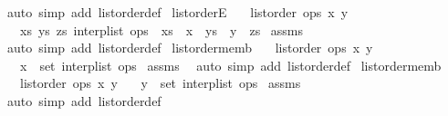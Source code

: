 \begin{isabellebody}
\ {\isacharparenleft}auto\ simp\ add{\isacharcolon}\ list{\isacharunderscore}order{\isacharunderscore}def{\isacharparenright}%
\endisatagproof
{\isafoldproof}%
%
\isadelimproof
\isanewline
%
\endisadelimproof
\isanewline
{}\isamarkupfalse%
\ list{\isacharunderscore}orderE{\isacharcolon}\isanewline
\ \ \ {\isachardoublequoteopen}list{\isacharunderscore}order\ ops\ x\ y{\isachardoublequoteclose}\isanewline
\ \ \ {\isachardoublequoteopen}{\isasymexists}xs\ ys\ zs{\isachardot}\ interp{\isacharunderscore}list\ ops\ {\isacharequal}\ xs\ {\isacharat}\ {\isacharbrackleft}x{\isacharbrackright}\ {\isacharat}\ ys\ {\isacharat}\ {\isacharbrackleft}y{\isacharbrackright}\ {\isacharat}\ zs{\isachardoublequoteclose}\isanewline
%
\isadelimproof
%
\endisadelimproof
%
\isatagproof
{}\isamarkupfalse%
\ assms\ \isamarkupfalse%
\ {\isacharparenleft}auto\ simp\ add{\isacharcolon}\ list{\isacharunderscore}order{\isacharunderscore}def{\isacharparenright}%
\endisatagproof
{\isafoldproof}%
%
\isadelimproof
\isanewline
%
\endisadelimproof
\isanewline
{}\isamarkupfalse%
\ list{\isacharunderscore}order{\isacharunderscore}memb{}{\isacharcolon}\isanewline
\ \ \ {\isachardoublequoteopen}list{\isacharunderscore}order\ ops\ x\ y{\isachardoublequoteclose}\isanewline
\ \ \ {\isachardoublequoteopen}x\ {\isasymin}\ set\ {\isacharparenleft}interp{\isacharunderscore}list\ ops{\isacharparenright}{\isachardoublequoteclose}\isanewline
%
\isadelimproof
%
\endisadelimproof
%
\isatagproof
{}\isamarkupfalse%
\ assms\ \isamarkupfalse%
\ {\isacharparenleft}auto\ simp\ add{\isacharcolon}\ list{\isacharunderscore}order{\isacharunderscore}def{\isacharparenright}%
\endisatagproof
{\isafoldproof}%
%
\isadelimproof
\isanewline
%
\endisadelimproof
\isanewline
{}\isamarkupfalse%
\ list{\isacharunderscore}order{\isacharunderscore}memb{}{\isacharcolon}\isanewline
\ \ \ {\isachardoublequoteopen}list{\isacharunderscore}order\ ops\ x\ y{\isachardoublequoteclose}\isanewline
\ \ \ {\isachardoublequoteopen}y\ {\isasymin}\ set\ {\isacharparenleft}interp{\isacharunderscore}list\ ops{\isacharparenright}{\isachardoublequoteclose}\isanewline
%
\isadelimproof
%
\endisadelimproof
%
\isatagproof
{}\isamarkupfalse%
\ assms\ \isamarkupfalse%
\ {\isacharparenleft}auto\ simp\ add{\isacharcolon}\ list{\isacharunderscore}order{\isacharunderscore}def{\isacharparenright}%

\end{isabellebody}
